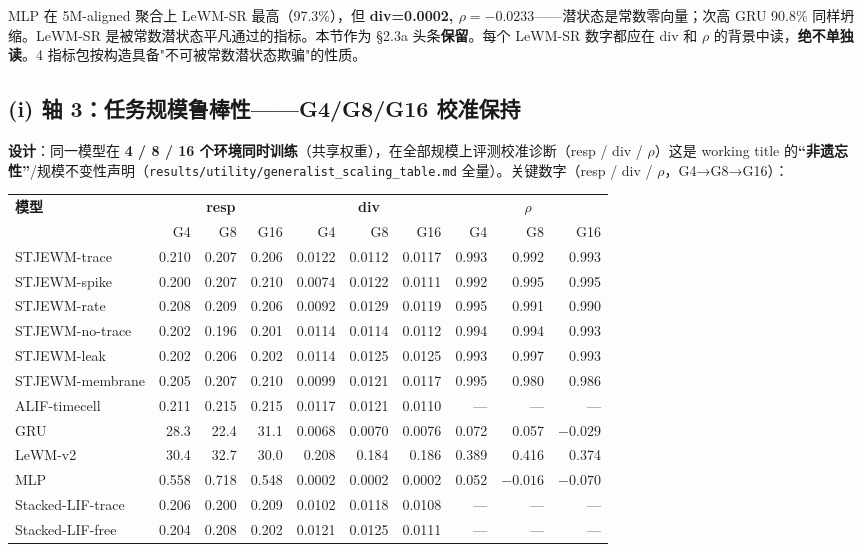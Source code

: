 \documentclass[11pt,a4paper]{article}
\begin{document}
MLP 在 5M-aligned 聚合上 LeWM-SR 最高（97.3\%），但 \textbf{div=0.0002, $\rho=-0.0233$}——潜状态是常数零向量；次高 GRU 90.8\% 同样坍缩。LeWM-SR 是被常数潜状态平凡通过的指标。本节作为 §2.3a 头条\textbf{保留}。每个 LeWM-SR 数字都应在 div 和 $\rho$ 的背景中读，\textbf{绝不单独读}。4 指标包按构造具备"不可被常数潜状态欺骗"的性质。

\subsection{(i) 轴 3：任务规模鲁棒性——G4/G8/G16 校准保持}

\textbf{设计}：同一模型在 \textbf{4 / 8 / 16 个环境同时训练}（共享权重），在全部规模上评测校准诊断（resp / div / $\rho$）\textendash{}这是 working title 的\textbf{“非遗忘性”}/规模不变性声明（\texttt{results/utility/generalist\_scaling\_table.md} 全量）。关键数字（resp / div / $\rho$，G4→G8→G16）：

\begin{adjustbox}{max width=\textwidth}
\scriptsize
\begin{tabular}{l rrr rrr rrr}
\toprule
\textbf{模型} & \multicolumn{3}{c}{\textbf{resp}} & \multicolumn{3}{c}{\textbf{div}} & \multicolumn{3}{c}{\textbf{$\rho$}} \\
 & G4 & G8 & G16 & G4 & G8 & G16 & G4 & G8 & G16 \\
\midrule
STJEWM-trace & 0.210 & 0.207 & 0.206 & 0.0122 & 0.0112 & 0.0117 & 0.993 & 0.992 & 0.993 \\
STJEWM-spike & 0.200 & 0.207 & 0.210 & 0.0074 & 0.0122 & 0.0111 & 0.992 & 0.995 & 0.995 \\
STJEWM-rate & 0.208 & 0.209 & 0.206 & 0.0092 & 0.0129 & 0.0119 & 0.995 & 0.991 & 0.990 \\
STJEWM-no-trace & 0.202 & 0.196 & 0.201 & 0.0114 & 0.0114 & 0.0112 & 0.994 & 0.994 & 0.993 \\
STJEWM-leak & 0.202 & 0.206 & 0.202 & 0.0114 & 0.0125 & 0.0125 & 0.993 & 0.997 & 0.993 \\
STJEWM-membrane & 0.205 & 0.207 & 0.210 & 0.0099 & 0.0121 & 0.0117 & 0.995 & 0.980 & 0.986 \\
ALIF-timecell & 0.211 & 0.215 & 0.215 & 0.0117 & 0.0121 & 0.0110 & --- & --- & --- \\
GRU & 28.3 & 22.4 & 31.1 & 0.0068 & 0.0070 & 0.0076 & 0.072 & 0.057 & $-0.029$ \\
LeWM-v2 & 30.4 & 32.7 & 30.0 & 0.208 & 0.184 & 0.186 & 0.389 & 0.416 & 0.374 \\
MLP & 0.558 & 0.718 & 0.548 & 0.0002 & 0.0002 & 0.0002 & 0.052 & $-0.016$ & $-0.070$ \\
Stacked-LIF-trace & 0.206 & 0.200 & 0.209 & 0.0102 & 0.0118 & 0.0108 & --- & --- & --- \\
Stacked-LIF-free & 0.204 & 0.208 & 0.202 & 0.0121 & 0.0125 & 0.0111 & --- & --- & --- \\
\bottomrule
\end{tabular}
\end{adjustbox}
\end{document}
